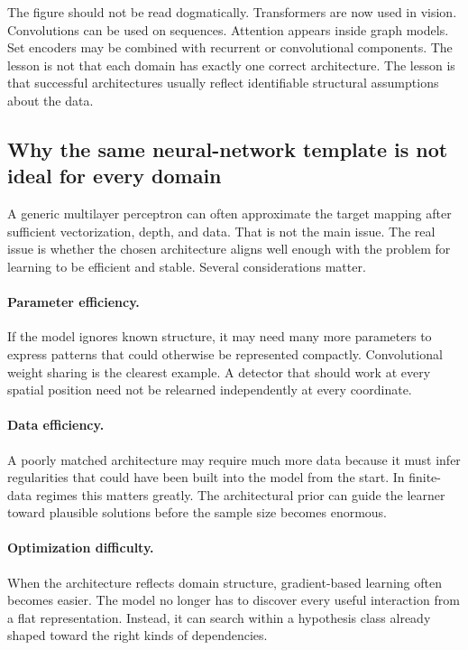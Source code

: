 \medskip

The figure should not be read dogmatically.
Transformers are now used in vision.
Convolutions can be used on sequences.
Attention appears inside graph models.
Set encoders may be combined with recurrent or convolutional components.
The lesson is not that each domain has exactly one correct architecture.
The lesson is that successful architectures usually reflect identifiable structural assumptions about the data.

\subsection*{Why the same neural-network template is not ideal for every domain}

A generic multilayer perceptron can often approximate the target mapping after sufficient vectorization, depth, and data.
That is not the main issue.
The real issue is whether the chosen architecture aligns well enough with the problem for learning to be efficient and stable.
Several considerations matter.

\paragraph{Parameter efficiency.}
If the model ignores known structure, it may need many more parameters to express patterns that could otherwise be represented compactly.
Convolutional weight sharing is the clearest example.
A detector that should work at every spatial position need not be relearned independently at every coordinate.

\paragraph{Data efficiency.}
A poorly matched architecture may require much more data because it must infer regularities that could have been built into the model from the start.
In finite-data regimes this matters greatly.
The architectural prior can guide the learner toward plausible solutions before the sample size becomes enormous.

\paragraph{Optimization difficulty.}
When the architecture reflects domain structure, gradient-based learning often becomes easier.
The model no longer has to discover every useful interaction from a flat representation.
Instead, it can search within a hypothesis class already shaped toward the right kinds of dependencies.

